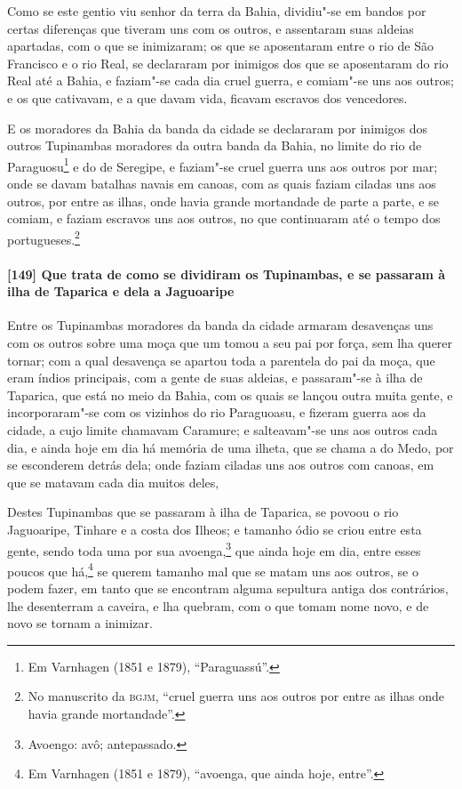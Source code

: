 \begin{linenumbers}
Como se este gentio viu senhor da terra da Bahia, dividiu"-se em bandos por certas
diferenças que tiveram uns com os outros, e assentaram suas aldeias apartadas, com o que
se inimizaram; os que se aposentaram entre o rio de São Francisco e o rio Real, se
declararam por inimigos dos que se aposentaram do rio Real até a Bahia, e faziam"-se cada
dia cruel guerra, e comiam"-se uns aos outros; e os que cativavam, e a que davam vida,
ficavam escravos dos vencedores.

E os moradores da Bahia da banda da cidade se declararam por inimigos dos outros
Tupinambas moradores da outra banda da Bahia, no limite do rio de Paraguosu\footnote{ Em
Varnhagen (1851 e 1879), ``Paraguassú''.} e do de Seregipe, e faziam"-se cruel guerra uns
aos outros por mar; onde se davam batalhas navais em canoas, com as quais faziam ciladas
uns aos outros, por entre as ilhas, onde havia grande mortandade de parte a parte, e se
comiam, e faziam escravos uns aos outros, no que continuaram até o tempo dos
portugueses.\footnote{ No manuscrito da \textsc{bgjm}, ``cruel guerra uns aos outros por
entre as ilhas onde havia grande mortandade''.}

\paragraph{[149] Que trata de como se dividiram os Tupinambas, e se passaram à ilha de
Taparica e dela a Jaguoaripe}\quad
Entre os Tupinambas moradores da banda da cidade armaram desavenças uns com os outros
sobre uma moça que um tomou a seu pai por força, sem lha querer tornar; com a qual
desavença se apartou toda a parentela do pai da moça, que eram índios principais, com a
gente de suas aldeias, e passaram"-se à ilha de Taparica, que está no meio da Bahia, com os
quais se lançou outra muita gente, e incorporaram"-se com os vizinhos do rio Paraguoasu, e
fizeram guerra aos da cidade, a cujo limite chamavam Caramure; e salteavam"-se uns aos
outros cada dia, e ainda hoje em dia há memória de uma ilheta, que se chama a do Medo, por
se esconderem detrás dela; onde faziam ciladas uns aos outros com canoas, em que se
matavam cada dia muitos deles,

Destes Tupinambas que se passaram à ilha de Taparica, se povoou o rio Jaguoaripe, Tinhare
e a costa dos Ilheos; e tamanho ódio se criou entre esta gente, sendo toda uma por sua
avoenga,\footnote{ Avoengo: avô; antepassado.} que ainda hoje em dia, entre esses poucos
que há,\footnote{ Em Varnhagen (1851 e 1879), ``avoenga, que ainda hoje, entre''.} se
querem tamanho mal que se matam uns aos outros, se o podem fazer, em tanto que se
encontram alguma sepultura antiga dos contrários, lhe desenterram a caveira, e lha
quebram, com o que tomam nome novo, e de novo se tornam a inimizar.


\end{linenumbers}
